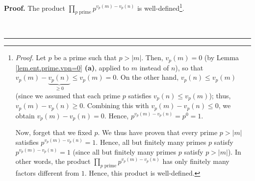 \documentclass[numbers=enddot,12pt,final,onecolumn,notitlepage]{scrartcl}%
\numberwithin{exer}{subsection}
\theoremstyle{definition}
\newenvironment{proof}[1][Proof]{\noindent\textbf{#1.} }{\ \rule{0.5em}{0.5em}}
\let\prodnonlimits\prod
\renewcommand{\prod}{\prodnonlimits\limits}
\begin{document}
\begin{proof}
The product $\prod_{p\text{ prime}}p^{v_{p}\left(  m\right)  -v_{p}\left(
n\right)  }$ is well-defined\footnote{\textit{Proof. }Let $p$ be a prime such
that $p>\left\vert m\right\vert $. Then, $v_{p}\left(  m\right)  =0$ (by Lemma
\ref{lem.ent.prime.vpn=0} \textbf{(a)}, applied to $m$ instead of $n$), so
that $v_{p}\left(  m\right)  -\underbrace{v_{p}\left(  n\right)  }_{\geq0}\leq
v_{p}\left(  m\right)  =0$. On the other hand, $v_{p}\left(  n\right)  \leq
v_{p}\left(  m\right)  $ (since we assumed that each prime $p$ satisfies
$v_{p}\left(  n\right)  \leq v_{p}\left(  m\right)  $); thus, $v_{p}\left(
m\right)  -v_{p}\left(  n\right)  \geq0$. Combining this with $v_{p}\left(
m\right)  -v_{p}\left(  n\right)  \leq0$, we obtain $v_{p}\left(  m\right)
-v_{p}\left(  n\right)  =0$. Hence, $p^{v_{p}\left(  m\right)  -v_{p}\left(
n\right)  }=p^{0}=1$.
\par
Now, forget that we fixed $p$. We thus have proven that every prime
$p>\left\vert m\right\vert $ satisfies $p^{v_{p}\left(  m\right)
-v_{p}\left(  n\right)  }=1$. Hence, all but finitely many primes $p$ satisfy
$p^{v_{p}\left(  m\right)  -v_{p}\left(  n\right)  }=1$ (since all but
finitely many primes $p$ satisfy $p>\left\vert m\right\vert $). In other
words, the product $\prod_{p\text{ prime}}p^{v_{p}\left(  m\right)
-v_{p}\left(  n\right)  }$ has only finitely many factors different from $1$.
Hence, this product is well-defined.}.


\end{proof}
\end{document}

